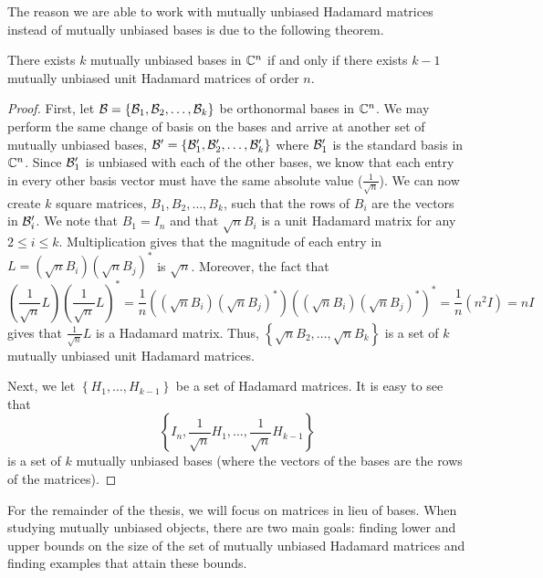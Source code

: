 The reason we are able to work with mutually unbiased Hadamard matrices instead of mutually unbiased bases is due to the following theorem.

\begin{theorem} \label{th:mub_muhm}
 There exists $k$ mutually unbiased bases in $\mathbb{C}^n$ if and only if there exists $k-1$ mutually unbiased unit Hadamard matrices of order $n$.
 \begin{proof}
  First, let $\mathcal{B} = \left\{\mathcal{B}_1,\mathcal{B}_2,\dots,\mathcal{B}_k\right\}$ be orthonormal bases in $\mathbb{C}^n$. We may perform the same change of basis on the bases and arrive at another set of mutually unbiased bases, $\mathcal{B}' = \left\{\mathcal{B}'_1,\mathcal{B}'_2,\dots,\mathcal{B}'_k\right\}$ where $\mathcal{B}'_1$ is the standard basis in $\mathbb{C}^n$. Since $\mathcal{B}'_1$ is unbiased with each of the other bases, we know that each entry in every other basis vector must have the same absolute value ($\frac{1}{\sqrt{n}}$). We can now create $k$ square matrices, $B_1,B_2,\dots,B_k$, such that the rows of $B_i$ are the vectors in $\mathcal{B}'_i$. We note that $B_1 = I_n$ and that $\sqrt{n}B_i$ is a unit Hadamard matrix for any $2 \leq i \leq k$. Multiplication gives that the magnitude of each entry in $L = \left(\sqrt{n}B_i\right)\left(\sqrt{n}B_j\right)^*$ is $\sqrt{n}$. Moreover, the fact that $$\left(\frac{1}{\sqrt{n}}L\right)\left(\frac{1}{\sqrt{n}}L\right)^* = \frac{1}{n} \left(\left(\sqrt{n}B_i\right)\left(\sqrt{n}B_j\right)^*\right)\left(\left(\sqrt{n}B_i\right)\left(\sqrt{n}B_j\right)^*\right)^* = \frac{1}{n}\left(n^2I\right) = nI$$ gives that $\frac{1}{\sqrt{n}}L$ is a Hadamard matrix. Thus, $\left\{\sqrt{n}B_2,\dots,\sqrt{n}B_k\right\}$ is a set of $k$ mutually unbiased unit Hadamard matrices.

  Next, we let $\left\{H_1,\dots,H_{k-1}\right\}$ be a set of Hadamard matrices. It is easy to see that $$\left\{I_n,\frac{1}{\sqrt{n}}H_1,\dots,\frac{1}{\sqrt{n}}H_{k-1}\right\}$$ is a set of $k$ mutually unbiased bases (where the vectors of the bases are the rows of the matrices).
 \end{proof}

\end{theorem}

For the remainder of the thesis, we will focus on matrices in lieu of bases. When studying mutually unbiased objects, there are two main goals: finding lower and upper bounds on the size of the set of mutually unbiased Hadamard matrices and finding examples that attain these bounds.

